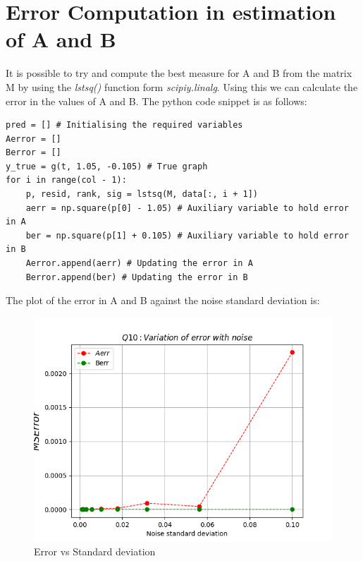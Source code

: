 \documentclass[11pt, a4paper]{article}
\begin{document}
\section{Error Computation in estimation of A and B} 
It is possible to try and compute the best measure for A and B from the matrix M by using the \textit{lstsq()} function form \textit{scipiy.linalg}.
Using this we can calculate the error in the values of A and B. The python code snippet is as follows:
\begin{verbatim}	
pred = [] # Initialising the required variables
Aerror = []
Berror = []
y_true = g(t, 1.05, -0.105) # True graph 
for i in range(col - 1):
    p, resid, rank, sig = lstsq(M, data[:, i + 1])
    aerr = np.square(p[0] - 1.05) # Auxiliary variable to hold error in A 
    ber = np.square(p[1] + 0.105) # Auxiliary variable to hold error in B
    Aerror.append(aerr) # Updating the error in A
    Berror.append(ber) # Updating the error in B
\end{verbatim}

The plot of the error in A and B against the noise standard deviation is:
	\begin{figure}[!tbh]
   	\centering
   	\includegraphics[scale=0.6]{Figure_Q10.png}   
   	\caption{Error vs Standard deviation}
   	\label{fig:sample}
   \end{figure} 
\end{document}

